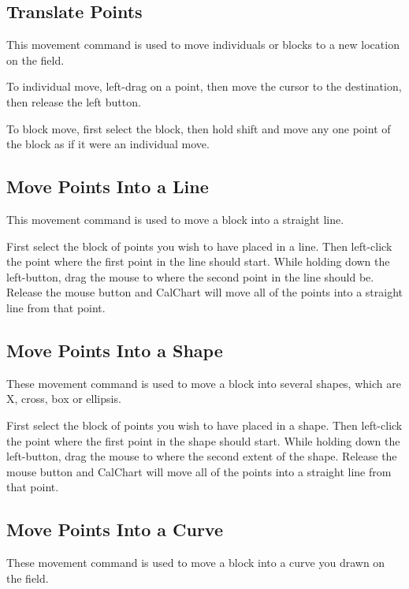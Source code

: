 \subsection{Translate Points}\label{translatepoints}

This movement command is used to move individuals or blocks to a new location on the field.

To individual move, left-drag on a point, then move the cursor to the destination, then release the left button.

To block move, first select the block, then hold shift and move any one point of the block as if it were an individual move.

\subsection{Move Points Into a Line}\label{movepointsintoaline}

This movement command is used to move a block into a straight line.

First select the block of points you wish to have placed in a line.  Then left-click the point where the first point in the line should start.  While holding down the left-button, drag the mouse to where the second point in the line should be.  Release the mouse button and CalChart will move all of the points into a straight line from that point.

\subsection{Move Points Into a Shape}\label{movepointsintoashape}

These movement command is used to move a block into several shapes, which are X, cross, box or ellipsis.

First select the block of points you wish to have placed in a shape.  Then left-click the point where the first point in the shape should start.  While holding down the left-button, drag the mouse to where the second extent of the shape.  Release the mouse button and CalChart will move all of the points into a straight line from that point.

\subsection{Move Points Into a Curve}\label{movepointsintoacurve}

These movement command is used to move a block into a curve you drawn on the field.

